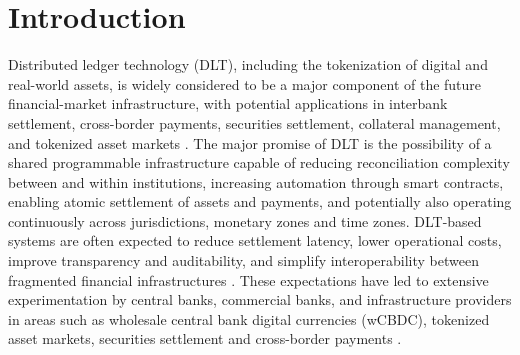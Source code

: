 \documentclass[
reprint,
showkeys,
superscriptaddress,
aps,
pra,
longbibliography,
nofootinbib,
]{revtex4-2}
\theoremstyle{definition}\newtheorem{definition}{Definition}
\begin{document}
	
	\maketitle
	
	\tableofcontents
	


	
	

\section{Introduction}
\label{sec:introduction}

Distributed ledger technology (DLT), including the tokenization of digital and real-world assets, is widely considered to be a major component of the future financial-market infrastructure, with potential applications in interbank settlement, cross-border payments, securities settlement, collateral management, and tokenized asset markets \cite{bisUnifiedLedger2025, oecdTokenisation2024,cpmiDlt2017, ecbDlt2016}. 
The major promise of DLT is the possibility of a shared programmable infrastructure capable of reducing reconciliation complexity between and within institutions, increasing automation through smart contracts, enabling atomic settlement of assets and payments, and potentially also operating continuously across jurisdictions, monetary zones and time zones.
DLT-based systems are often expected to reduce settlement latency, lower operational costs, improve transparency and auditability, and simplify interoperability between fragmented financial infrastructures \cite{cpmiDlt2017,bisUnifiedLedger2023}.
These expectations have led to extensive experimentation by central banks, commercial banks, and infrastructure providers in areas such as wholesale central bank digital currencies (wCBDC), tokenized asset markets, securities settlement and cross-border payments \cite{bisMbridge2022,bisUnifiedLedger2023}.
\end{document}
